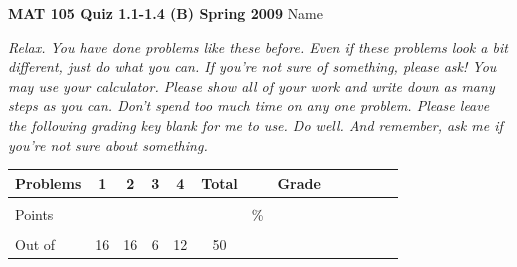 \documentclass[12pt]{article}
\begin{document}
{\bf MAT 105 Quiz 1.1-1.4 (B) Spring 2009} \hspace{.4in} {\large Name} \hrulefill

\hrulefill

 \emph{Relax.  You have done problems like these before.  Even if these problems look a bit different, just do what you can.  If you're not sure of something, please ask! You may use your calculator.  Please show all of your work and write down as many steps as you can.  Don't spend too much time on any one problem.  Please leave the following grading key blank for me to use.  Do well.  And remember, ask me if you're not sure about something.}

\begin{center}

\begin{tabular}
{|l|c|c|c|c|c|c|c|c|c|c|c|c|} \hline

 Problems & \hspace{5 pt} 1 \hspace{5 pt}  & \hspace{5 pt} 2 \hspace{5 pt} & \hspace{5 pt} 3 \hspace{5 pt} & \hspace{5 pt} 4 \hspace{5 pt} &  \hspace{5 pt} Total  \hspace{5 pt} & &  \hspace{5 pt} Grade \hspace{5 pt}  \\ \hline
&&&&& &&\\  
Points &&&&& &    \hspace{.8in}\% &  \\ 
&&&&& && \\  \hline
Out of & 16 & 16 & 6 & 12 &50 & & \\ \hline

\end {tabular}

\end{center}

\hrulefill
\end{document}
